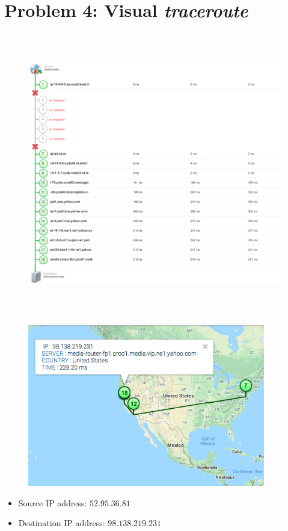 \documentclass[]{report}
\begin{document}
\section{Problem 4: Visual \textit{traceroute}}
\begin{figure}[H]
	\vspace{0pt}
	\includegraphics[height = 350pt, keepaspectratio]{Snapshots/exe4/q4_1.png}
\end{figure}

\begin{figure}[H]
	\vspace{0pt}
	\includegraphics[height = 200pt, keepaspectratio]{Snapshots/exe4/q4_2.png}
\end{figure}

\begin{itemize}
	\item Source IP address: $52.95.36.81$
	\item Destination IP address: $98.138.219.231$
\end{itemize}
\end{document}
